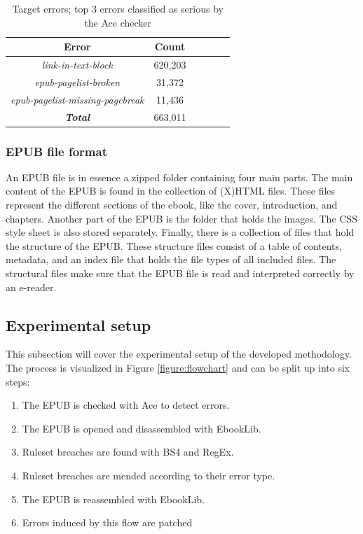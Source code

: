 \begin{table}[h!]
\begin{center}
\begin{tabular}{ | c || c | c | c | c | c |} 
\hline
\textbf{Error} & \textbf{Count} \\
\hline
\textit{link-in-text-block} & 620,203 \\ 
\hline
\textit{epub-pagelist-broken} & 31,372 \\
\hline
\textit{epub-pagelist-missing-pagebreak} & 11,436 \\
\hline
\hline
\textbf{\textit{Total}} & 663,011 \\
\hline
\end{tabular}
\end{center}
\normalsize
\caption{Target errors; top 3 errors classified as serious by the Ace checker}
\label{table:datatargeterrors}
\end{table}


\subsubsection{EPUB file format}
An EPUB file is in essence a zipped folder containing four main parts. The main content of the EPUB is found in the collection of (X)HTML files. These files represent the different sections of the ebook, like the cover, introduction, and chapters. Another part of the EPUB is the folder that holds the images. The CSS style sheet is also stored separately. Finally, there is a collection of files that hold the structure of the EPUB. These structure files consist of a table of contents, metadata, and an index file that holds the file types of all included files. The structural files make sure that the EPUB file is read and interpreted correctly by an e-reader.

\subsection{Experimental setup}
This subsection will cover the experimental setup of the developed methodology. The process is visualized in Figure \ref{figure:flowchart} and can be split up into six steps:\\

\begin{enumerate}
  \item The EPUB is checked with Ace to detect errors.
  \item The EPUB is opened and disassembled with EbookLib.
  \item Ruleset breaches are found with BS4 and RegEx.
  \item Ruleset breaches are mended according to their error type.
  \item The EPUB is reassembled with EbookLib.
  \item Errors induced by this flow are patched
\end{enumerate}

